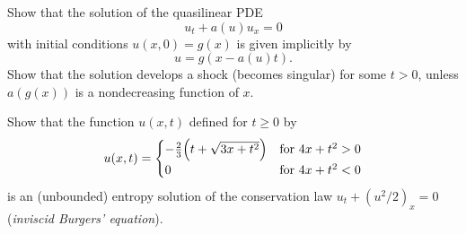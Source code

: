 \begin{problem}
  Show that the solution of the quasilinear PDE
  \[
    u_t+a(u)u_x=0
  \]
  with initial conditions \(u(x,0)=g(x)\) is given implicitly by
  \[
    u=g(x-a(u)t).
  \]
  Show that the solution develops a shock (becomes singular) for some
  \(t>0\), unless \(a(g(x))\) is a nondecreasing function of
  \(x\).
\end{problem}
\begin{solution*}
\end{solution*}

\begin{problem}
  Show that the function \(u(x,t)\) defined for \(t\geq 0\) by
  \[
    u(x,t)=
    \begin{cases}
      -\tfrac{2}{3}\Bigl(t+\sqrt{3x+t^2}\Bigr)
      &\text{for \(4x+t^2>0\)}\\
      0
      &\text{for \(4x+t^2<0\)}
    \end{cases}
  \]
  is an (unbounded) entropy solution of the conservation law
  \(u_t+(u^2/2)_x=0\) (\emph{inviscid Burgers' equation}).
\end{problem}
\begin{solution*}
\end{solution*}

